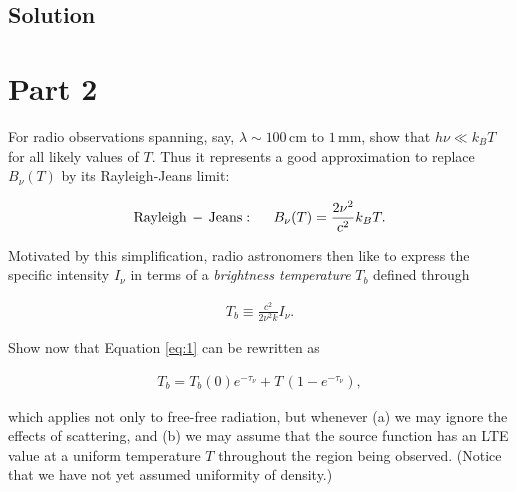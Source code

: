 \documentclass[12pt]{article}
\begin{document}

\subsection*{Solution}




\section*{Part 2}

For radio observations spanning, say, $\lambda \sim 100\,\mathrm{cm}$ to $1\,\mathrm{mm}$, show that $h\nu \ll k_BT$ for all likely values of $T$. Thus it represents a good approximation to replace $B_\nu(T)$ by its Rayleigh-Jeans limit:

\begin{align*}
{\rm Rayleigh\,-\, Jeans:}~~~~~B_\nu(T)=\frac{2\nu^2}{c^2}k_BT.
\end{align*}

Motivated by this simplification, radio astronomers then like to express the specific intensity $I_\nu$ in terms of a \textit{brightness temperature} $T_b$ defined through 

\begin{align} \label{eq:2}
T_b \equiv \frac{c^2}{2\nu^2k}I_\nu.
\end{align}

Show now that Equation \ref{eq:1} can be rewritten as 

\begin{align} \label{eq:3}
T_b = T_b(0)e^{-\tau_\nu} +T\,(1-e^{-\tau_\nu}),
\end{align}

{\noindent}which applies not only to free-free radiation, but whenever (a) we may ignore the effects of scattering, and (b) we may assume that the source function has an LTE value at a uniform temperature $T$ throughout the region being observed. (Notice that we have not yet assumed uniformity of density.)

\end{document}
